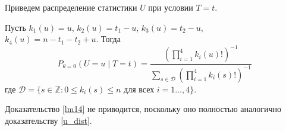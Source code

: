     Приведем распределение статистики $U$ при условии $T=t$.
\begin{lemma}\label{lm14}
    Пусть $k_1(u)=u$, $k_2(u)=t_1-u$, $k_3(u)=t_2-u$,\\
    $k_4(u)=n-t_1-t_2+u$.
        Тогда
        $$P_{\theta=0}(U=u \mid T=t)=\dfrac{(\prod_{i=1}^4 k_i(u)!)^{-1}}
            {\sum_{s\in \mathcal{D}} (\prod_{i=1}^4 k_i(s)!)^{-1}}$$
        где $\mathcal{D}=\{s \in \mathbb{Z}: 0\leq k_i(s) \leq n \text{ для всех } i=1\ldots,4\}$.
\end{lemma}
Доказательство \autoref{lm14} не приводится, поскольку оно полностью 
аналогично доказательству \autoref{u_dist}.



